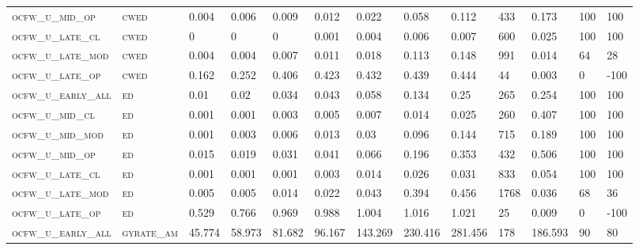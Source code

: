 \begin{landscape}
\begin{center}
\begin{footnotesize}
\begin{longtable}{lllllllllllll}
\textsc{ocfw\_u\_mid\_op   } & \textsc{cwed      }   & 0.004    & 0.006    & 0.009    & 0.012    & 0.022    & 0.058    & 0.112     & 433    & 0.173         & 100           & 100      \\
\textsc{ocfw\_u\_late\_cl  } & \textsc{cwed      }   & 0        & 0        & 0        & 0.001    & 0.004    & 0.006    & 0.007     & 600    & 0.025         & 100           & 100      \\
\textsc{ocfw\_u\_late\_mod } & \textsc{cwed      }   & 0.004    & 0.004    & 0.007    & 0.011    & 0.018    & 0.113    & 0.148     & 991    & 0.014         & 64            & 28       \\
\textsc{ocfw\_u\_late\_op  } & \textsc{cwed      }   & 0.162    & 0.252    & 0.406    & 0.423    & 0.432    & 0.439    & 0.444     & 44     & 0.003         & 0             & -100     \\
\textsc{ocfw\_u\_early\_all} & \textsc{ed        }   & 0.01     & 0.02     & 0.034    & 0.043    & 0.058    & 0.134    & 0.25      & 265    & 0.254         & 100           & 100      \\
\textsc{ocfw\_u\_mid\_cl   } & \textsc{ed        }   & 0.001    & 0.001    & 0.003    & 0.005    & 0.007    & 0.014    & 0.025     & 260    & 0.407         & 100           & 100      \\
\textsc{ocfw\_u\_mid\_mod  } & \textsc{ed        }   & 0.001    & 0.003    & 0.006    & 0.013    & 0.03     & 0.096    & 0.144     & 715    & 0.189         & 100           & 100      \\
\textsc{ocfw\_u\_mid\_op   } & \textsc{ed        }   & 0.015    & 0.019    & 0.031    & 0.041    & 0.066    & 0.196    & 0.353     & 432    & 0.506         & 100           & 100      \\
\textsc{ocfw\_u\_late\_cl  } & \textsc{ed        }   & 0.001    & 0.001    & 0.001    & 0.003    & 0.014    & 0.026    & 0.031     & 833    & 0.054         & 100           & 100      \\
\textsc{ocfw\_u\_late\_mod } & \textsc{ed        }   & 0.005    & 0.005    & 0.014    & 0.022    & 0.043    & 0.394    & 0.456     & 1768   & 0.036         & 68            & 36       \\
\textsc{ocfw\_u\_late\_op  } & \textsc{ed        }   & 0.529    & 0.766    & 0.969    & 0.988    & 1.004    & 1.016    & 1.021     & 25     & 0.009         & 0             & -100     \\
\textsc{ocfw\_u\_early\_all} & \textsc{gyrate\_am}   & 45.774   & 58.973   & 81.682   & 96.167   & 143.269  & 230.416  & 281.456   & 178    & 186.593       & 90            & 80       \\

\end{longtable}
\end{footnotesize}
\end{center}
\end{landscape}

